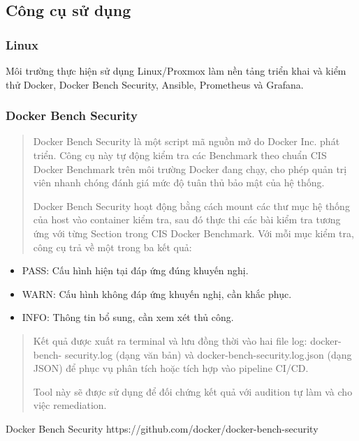 \subsection{Công cụ sử dụng}\label{cong-cu-su-dung}

\subsubsection{Linux}\label{linux}

Môi trường thực hiện sử dụng Linux/Proxmox làm nền tảng triển khai và kiểm thử Docker, Docker Bench Security, Ansible, Prometheus và Grafana.

\subsubsection{Docker Bench Security}\label{docker-bench-security}

\begin{quote}
Docker Bench Security là một script mã nguồn mở do Docker Inc. phát triển. Công cụ này tự động kiểm tra các Benchmark theo chuẩn CIS Docker Benchmark trên môi trường Docker đang chạy, cho phép quản trị viên nhanh chóng đánh giá mức độ tuân thủ bảo mật của hệ thống.

Docker Bench Security hoạt động bằng cách mount các thư mục hệ thống của host vào container kiểm tra, sau đó thực thi các bài kiểm tra tương ứng với từng Section trong CIS Docker Benchmark. Với mỗi mục kiểm tra, công cụ trả về một trong ba kết quả:
\end{quote}

\begin{itemize}
\item
  PASS: Cấu hình hiện tại đáp ứng đúng khuyến nghị.
\item
  WARN: Cấu hình không đáp ứng khuyến nghị, cần khắc phục.
\item
  INFO: Thông tin bổ sung, cần xem xét thủ công.
\end{itemize}

\begin{quote}
Kết quả được xuất ra terminal và lưu đồng thời vào hai file log: docker-bench- security.log (dạng văn bản) và docker-bench-security.log.json (dạng JSON) để phục vụ phân tích hoặc tích hợp vào pipeline CI/CD.

Tool này sẽ được sử dụng để đối chứng kết quả với audition tự làm và cho việc remediation.
\end{quote}

Docker Bench Security https://github.com/docker/docker-bench-security\protect{}\label{_bookmark25}{}

